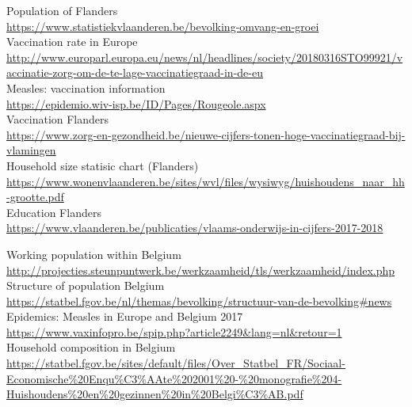\documentclass[runningheads]{llncs}
\begin{document}
	
	\newpage
	\begin{thebibliography}{20}
		Population of Flanders \\
		\url{https://www.statistiekvlaanderen.be/bevolking-omvang-en-groei}
		\\
		
		Vaccination rate in Europe \\
		\url{http://www.europarl.europa.eu/news/nl/headlines/society/20180316STO99921/vaccinatie-zorg-om-de-te-lage-vaccinatiegraad-in-de-eu}
		\\
		
		Measles: vaccination information \\
		\url{https://epidemio.wiv-isp.be/ID/Pages/Rougeole.aspx}
		\\
		
		Vaccination Flanders \\
		\url{https://www.zorg-en-gezondheid.be/nieuwe-cijfers-tonen-hoge-vaccinatiegraad-bij-vlamingen}
		\\
		
		Household size statisic chart (Flanders) \\
		\url{https://www.wonenvlaanderen.be/sites/wvl/files/wysiwyg/huishoudens\_naar\_hh-grootte.pdf}
		\\
		
		Education Flanders \\
		\url{https://www.vlaanderen.be/publicaties/vlaams-onderwijs-in-cijfers-2017-2018}
		
		Working population within Belgium \\
		\url{http://projecties.steunpuntwerk.be/werkzaamheid/tls/werkzaamheid/index.php}
		\\
		
		Structure of population Belgium \\
		\url{https://statbel.fgov.be/nl/themas/bevolking/structuur-van-de-bevolking\#news}
		\\
		
		Epidemics: Measles in Europe and Belgium 2017 \\
		\url{https://www.vaxinfopro.be/spip.php?article2249\&lang=nl\&retour=1}
		\\
		
		Household composition in Belgium \\
		\url{https://statbel.fgov.be/sites/default/files/Over\_Statbel\_FR/Sociaal-Economische\%20Enqu\%C3\%AAte\%202001\%20-\%20monografie\%204-Huishoudens\%20en\%20gezinnen\%20in\%20Belgi\%C3\%AB.pdf}	
		\\
		

\end{thebibliography}
\end{document}
